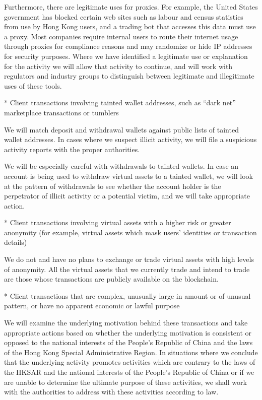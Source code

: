 Furthermore, there are legitimate uses for proxies.  For example, the
United States government has blocked certain web sites such as labour
and census statistics from use by Hong Kong users, and a trading bot
that accesses this data must use a proxy.  Most companies require
internal users to route their internet usage through proxies for
compliance reasons and may randomize or hide IP addresses for security
purposes.  Where we have identified a legitimate use or explanation
for the activity we will allow that activity to continue, and will
work with regulators and industry groups to distinguish between
legitimate and illegitimate uses of these tools.

* Client transactions involving tainted wallet addresses, such as
“dark net” marketplace transactions or tumblers

We will match deposit and withdrawal wallets against public lists of
tainted wallet addresses.  In cases where we suspect illicit activity,
we will file a suspicious activity reports with the proper
authorities.

We will be especially careful with withdrawals to tainted wallets.  In
case an account is being used to withdraw virtual assets to a
tainted wallet, we will look at the pattern of withdrawals to see
whether the account holder is the perpetrator of illicit
activity or a potential victim, and we will take appropriate action.

* Client transactions involving virtual assets with a higher risk or
greater anonymity (for example, virtual assets which mask users’
identities or transaction details)

We do not and have no plans to exchange or trade virtual assets with
high levels of anonymity.  All the virtual assets that we currently
trade and intend to trade are those whose transactions are publicly
available on the blockchain.

* Client transactions that are complex, unusually large in amount or
of unusual pattern, or have no apparent economic or lawful purpose

We will examine the underlying motivation behind these transactions
and take appropriate actions based on whether the underlying
motivation is consistent or opposed to the national interests of the
People's Republic of China and the laws of the Hong Kong Special
Administrative Region.  In situations where we conclude that the
underlying activity promotes activities which are contrary to the laws
of the HKSAR and the national interests of the People's Republic
of China or if we are unable to determine the ultimate purpose of
these activities, we shall work with the authorities to address with
these activities according to law.

